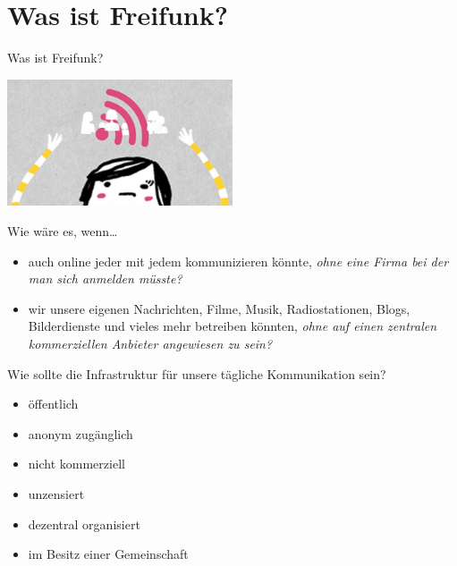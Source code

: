 \documentclass{beamer}
\begin{document}
\section{Was ist Freifunk?}
\begin{frame}{Was ist Freifunk?}
\vfill
\begin{center}
\includegraphics[width=0.5\textwidth]{images/up}
\end{center}
\vfill
Wie wäre es, wenn\ldots
\vfill
\begin{itemize}
\pause\item auch online jeder mit jedem kommunizieren könnte\pause , \textit{ohne eine Firma bei der man sich anmelden müsste?}
\vfill
\pause\item wir unsere eigenen Nachrichten, Filme, Musik, Radiostationen, Blogs, Bilderdienste und vieles mehr betreiben könnten\pause ,  \textit{ohne auf einen zentralen kommerziellen Anbieter angewiesen zu sein?}
\end{itemize}
\end{frame}




\begin{frame}{Wie sollte die Infrastruktur für unsere tägliche Kommunikation sein?}
\vfill
\begin{itemize}
\pause\item öffentlich
\pause\item anonym zugänglich
\pause\item nicht kommerziell
\pause\item unzensiert
\pause\item dezentral organisiert
\pause\item im Besitz einer Gemeinschaft
\end{itemize}
\vfill
\end{frame}
\end{document}
